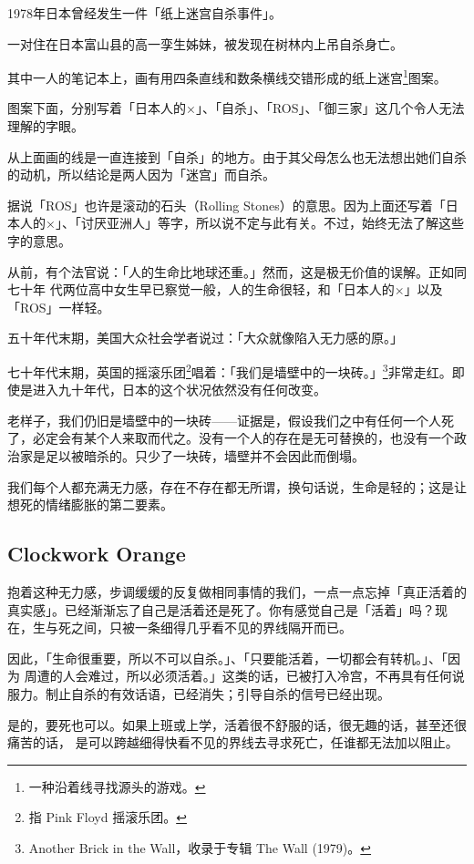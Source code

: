 \documentclass[UTF8]{ctexart}
\begin{document}
1978年日本曾经发生一件「纸上迷宫自杀事件」。

一对住在日本富山县的高一孪生姊妹，被发现在树林内上吊自杀身亡。

其中一人的笔记本上，画有用四条直线和数条横线交错形成的纸上迷宫\footnote{一种沿着线寻找源头的游戏。}图案。

图案下面，分别写着「日本人的×」、「自杀」、「ROS」、「御三家」这几个令人无法理解的字眼。

从上面画的线是一直连接到「自杀」的地方。由于其父母怎么也无法想出她们自杀的动机，所以结论是两人因为「迷宫」而自杀。

据说「ROS」也许是滚动的石头（Rolling Stones）的意思。因为上面还写着「日本人的×」、「讨厌亚洲人」等字，所以说不定与此有关。不过，始终无法了解这些字的意思。

从前，有个法官说：「人的生命比地球还重。」然而，这是极无价值的误解。正如同七十年 代两位高中女生早已察觉一般，人的生命很轻，和「日本人的×」以及「ROS」一样轻。

五十年代末期，美国大众社会学者说过：「大众就像陷入无力感的原。」

七十年代末期，英国的摇滚乐团\footnote{指 Pink Floyd 摇滚乐团。}唱着：「我们是墙壁中的一块砖。」\footnote{Another Brick in the Wall，收录于专辑 The Wall (1979)。}非常走红。即使是进入九十年代，日本的这个状况依然没有任何改变。

老样子，我们仍旧是墙壁中的一块砖——证据是，假设我们之中有任何一个人死了，必定会有某个人来取而代之。没有一个人的存在是无可替换的，也没有一个政治家是足以被暗杀的。只少了一块砖，墙壁并不会因此而倒塌。 

我们每个人都充满无力感，存在不存在都无所谓，换句话说，生命是轻的；这是让想死的情绪膨胀的第二要素。

\subsection{Clockwork Orange}

抱着这种无力感，步调缓缓的反复做相同事情的我们，一点一点忘掉「真正活着的真实感」。已经渐渐忘了自己是活着还是死了。你有感觉自己是「活着」吗？现在，生与死之间，只被一条细得几乎看不见的界线隔开而已。

因此，「生命很重要，所以不可以自杀。」、「只要能活着，一切都会有转机。」、「因为 周遭的人会难过，所以必须活着。」这类的话，已被打入冷宫，不再具有任何说服力。制止自杀的有效话语，已经消失；引导自杀的信号已经出现。

是的，要死也可以。如果上班或上学，活着很不舒服的话，很无趣的话，甚至还很痛苦的话， 是可以跨越细得快看不见的界线去寻求死亡，任谁都无法加以阻止。
\end{document}
